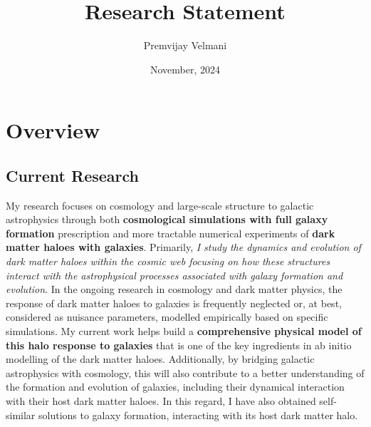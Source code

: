 \documentclass[12pt]{article}
\title{Research Statement}
\author{Premvijay Velmani}
\date{November, 2024}
\begin{document}
\maketitle




\section{Overview}
\subsection{Current Research}
My research focuses on cosmology and large-scale structure to galactic astrophysics through both \textbf{cosmological simulations with full galaxy formation} prescription and more tractable numerical experiments of \textbf{dark matter haloes with galaxies}. Primarily, \textit{I study the dynamics and evolution of dark matter haloes within the cosmic web focusing on how these structures interact with the astrophysical processes associated with galaxy formation and evolution}. In the ongoing research in cosmology and dark matter physics, the response of dark matter haloes to galaxies is frequently neglected or, at best, considered as nuisance parameters, modelled empirically based on specific simulations. 
My current work helps build a \textbf{comprehensive physical model of this halo response to galaxies} that is one of the key ingredients in ab initio modelling of the dark matter haloes. Additionally, by bridging galactic astrophysics with cosmology, this will also contribute to a better understanding of the formation and evolution of galaxies, including their dynamical interaction with their host dark matter haloes. In this regard, I have also obtained self-similar solutions to galaxy formation, interacting with its host dark matter halo.
\end{document}
